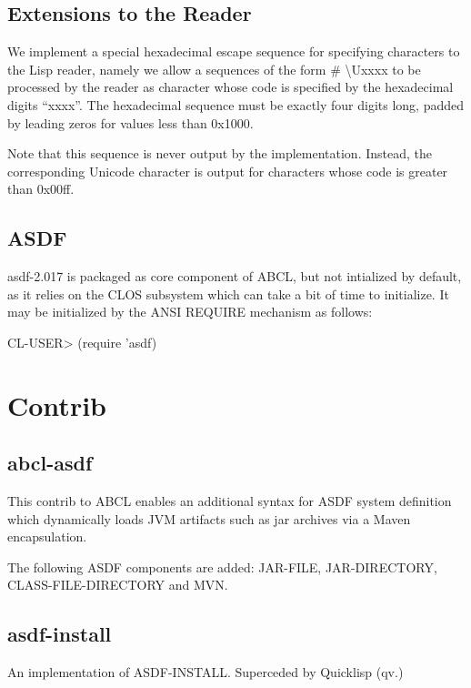 \documentclass[10pt]{book}
\begin{document}
\section{Extensions to the Reader}

We implement a special hexadecimal escape sequence for specifying
characters to the Lisp reader, namely we allow a sequences of the form
\# \textbackslash Uxxxx to be processed by the reader as character whose code is
specified by the hexadecimal digits ``xxxx''.  The hexadecimal sequence
must be exactly four digits long, padded by leading zeros for values
less than 0x1000.

Note that this sequence is never output by the implementation.  Instead,
the corresponding Unicode character is output for characters whose
code is greater than 0x00ff.

\section{ASDF}

asdf-2.017 is packaged as core component of ABCL, but not intialized
by default, as it relies on the CLOS subsystem which can take a bit of
time to initialize.  It may be initialized by the ANSI
\textsc{REQUIRE} mechanism as follows:

\begin{listing-lisp}
CL-USER> (require 'asdf)
\end{listing-lisp}

\chapter{Contrib}

\section{abcl-asdf}

This contrib to ABCL enables an additional syntax for ASDF system
definition which dynamically loads JVM artifacts such as jar archives
via a Maven encapsulation.

The following ASDF components are added:  JAR-FILE, JAR-DIRECTORY, CLASS-FILE-DIRECTORY
and MVN.

\section{asdf-install}

An implementation of ASDF-INSTALL.  Superceded by Quicklisp (qv.)
\end{document}
